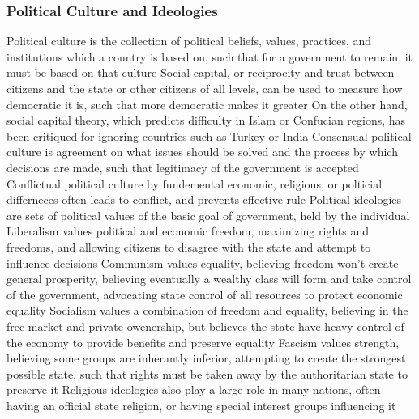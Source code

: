 \documentclass[11 pt, twoside]{article}
\newenvironment{outline*}
{
	\begin{outline}[enumerate]
	}
	{\end{outline}
}
\begin{document}
\subsubsection{Political Culture and Ideologies}
\begin{outline*}
\1 Political culture is the collection of political beliefs, values, practices, and institutions which a country is based on, such that for a government to remain, it must be based on that culture
\2 Social capital, or reciprocity and trust between citizens and the state or other citizens of all levels, can be used to measure how democratic it is, such that more democratic makes it greater
\3 On the other hand, social capital theory, which predicts difficulty in Islam or Confucian regions, has been critiqued for ignoring countries such as Turkey or India
\2 Consensual political culture is agreement on what issues should be solved and the process by which decisions are made, such that legitimacy of the government is accepted
\2 Conflictual political culture by fundemental economic, religious, or polticial differneces often leads to conflict, and prevents effective rule
\1 Political ideologies are sets of political values of the basic goal of government, held by the individual
\2 Liberalism values political and economic freedom, maximizing rights and freedoms, and allowing citizens to disagree with the state and attempt to influence decisions
\2 Communism values equality, believing freedom won't create general prosperity, believing eventually a wealthy class will form and take control of the government, advocating state control of all resources to protect economic equality
\2 Socialism values a combination of freedom and equality, believing in the free market and private owenership, but believes the state have heavy control of the economy to provide benefits and preserve equality
\2 Fascism values strength, believing some groups are inherantly inferior, attempting to create the strongest possible state, such that rights must be taken away by the authoritarian state to preserve it
\2 Religious ideologies also play a large role in many nations, often having an official state religion, or having special interest groups influencing it
\end{outline*}
\end{document}
